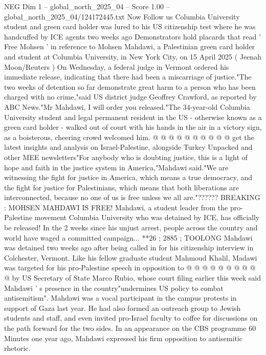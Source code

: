 \begin{textsample}{NEG Dim 1 – global\_north\_2025\_04 – Score 1.00 – global\_north\_2025\_04/124172445.txt}  \label{ex:f1_neg_104}
Now Follow us Columbia University student and green card holder was lured to his US citizenship test where he was handcuffed by ICE agents two weeks ago Demonstrators hold placards that read ' Free Mohsen ' in reference to Mohsen Mahdawi, a Palestinian green card holder and student at Columbia University, in New York City, on 15 April 2025 ( Jeenah Moon/Reuters ) On Wednesday, a federal judge in Vermont ordered his immediate release, indicating that there had been a miscarriage of justice."The two weeks of detention so far demonstrate great harm to a person who has been charged with no crime,"said US district judge Geoffrey Crawford, as reported by ABC News."Mr Mahdawi, I will order you released."The 34-year-old Columbia University student and legal permanent resident in the US - otherwise known as a green card holder - walked out of court with his hands in the air in a victory sign, as a boisterous, cheering crowd welcomed him. @ @ @ @ @ @ @ @ @ @ get the latest insights and analysis on Israel-Palestine, alongside Turkey Unpacked and other MEE newsletters"For anybody who is doubting justice, this is a light of hope and faith in the justice system in America,"Mahdawi said."We are witnessing the fight for justice in America, which means a true democracy, and the fight for justice for Palestinians, which means that both liberations are interconnected, because no one of us is free unless we all are."??????
BREAKING : MOHSEN MAHDAWI IS FREE!
Mahdawi, a student leader from the pro-Palestine movement Columbia University who was detained by ICE, has officially be released!
In the 2 weeks since his unjust arrest, people across the country and world have waged a committed campaign... **26 ; 2885 ; TOOLONG Mahdawi was detained two weeks ago after being called in for his citizenship interview in Colchester, Vermont.
Like his fellow graduate student Mahmoud Khalil, Madawi was targeted for his pro-Palestine speech in opposition to @ @ @ @ @ @ @ @ @ @ by US Secretary of State Marco Rubio, whose court filing earlier this week said Mahdawi ' s presence in the country"undermines US policy to combat antisemitism".
Mahdawi was a vocal participant in the campus protests in support of Gaza last year.
He had also formed an outreach group to Jewish students and staff, and even invited pro-Israel faculty to coffee for discussions on the path forward for the two sides.
In an appearance on the CBS programme 60 Minutes one year ago, Mahdawi expressed his firm opposition to antisemitic rhetoric.

\end{textsample}
